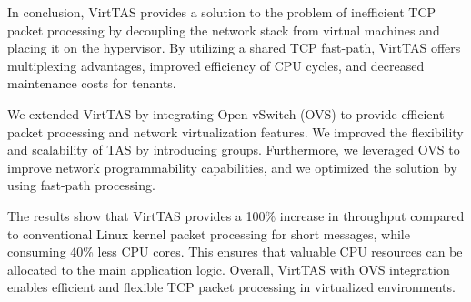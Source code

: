 In conclusion, VirtTAS provides a solution to the problem of inefficient TCP packet 
processing by decoupling the network stack from virtual machines and placing it on the 
hypervisor. By utilizing a shared TCP fast-path, VirtTAS offers multiplexing advantages, 
improved efficiency of CPU cycles, and decreased maintenance costs for tenants.

We extended VirtTAS by integrating Open vSwitch (OVS) to provide 
efficient packet processing and network virtualization features. We 
improved the flexibility and scalability of TAS by introducing groups. Furthermore, we leveraged OVS to
improve network programmability capabilities, and we optimized the solution by using fast-path processing.

The results show that VirtTAS provides a 100\% increase in throughput compared to conventional 
Linux kernel packet processing for short messages, while consuming 40\% less CPU cores. 
This ensures that valuable CPU resources can be allocated to the main application logic. 
Overall, VirtTAS with OVS integration enables efficient and flexible TCP packet processing 
in virtualized environments.